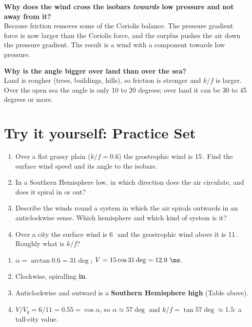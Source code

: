 \begin{askbox}
\textbf{Why does the wind cross the isobars \emph{towards} low pressure and not away from it?}\\
Because friction removes some of the Coriolis balance. The pressure gradient force is now larger than the Coriolis force, and the surplus pushes the air down the pressure gradient. The result is a wind with a component towards low pressure.
\end{askbox}

\begin{askbox}
\textbf{Why is the angle bigger over land than over the sea?}\\
Land is rougher (trees, buildings, hills), so friction is stronger and $k/f$ is larger. Over the open sea the angle is only 10 to 20 degrees; over land it can be 30 to 45 degrees or more.
\end{askbox}

\section{Try it yourself: Practice Set~\thechapter}

\begin{tryit}
\begin{enumerate}[label=\textbf{\thechapter.\arabic*},leftmargin=*,itemsep=3pt]
\item Over a flat grassy plain ($k/f=0.6$) the geostrophic wind is 15\,\ms. Find the surface wind speed and its angle to the isobars.
\item In a Southern Hemisphere low, in which direction does the air circulate, and does it spiral in or out?
\item Describe the winds round a system in which the air spirals outwards in an anticlockwise sense. Which hemisphere and which kind of system is it?
\item Over a city the surface wind is 6\,\ms\ and the geostrophic wind above it is 11\,\ms. Roughly what is $k/f$?
\end{enumerate}
\end{tryit}

\begin{answerbox}
\begin{enumerate}[label=\textbf{\thechapter.\arabic*},leftmargin=*,itemsep=3pt]
\item $\alpha=\arctan0.6=31\deg$; $V=15\cos31\deg=12.9\ \ms$.
\item Clockwise, spiralling \textbf{in}.
\item Anticlockwise and outward is a \textbf{Southern Hemisphere high} (Table above).
\item $V/V_g=6/11=0.55=\cos\alpha$, so $\alpha\approx57\deg$ and $k/f=\tan57\deg\approx1.5$: a tall-city value.
\end{enumerate}
\end{answerbox}
